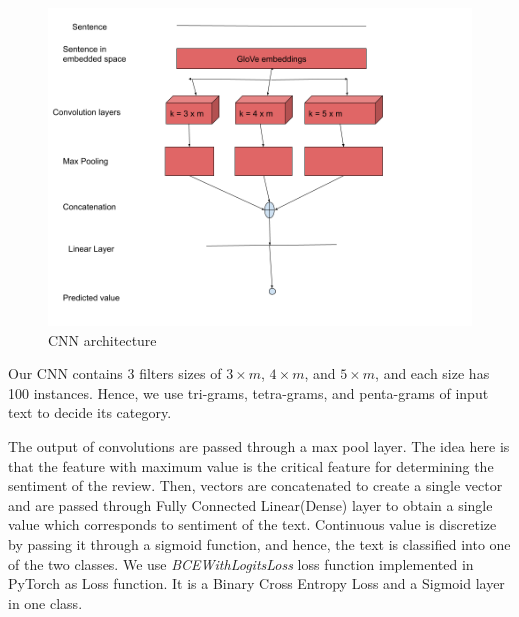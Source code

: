 \documentclass[12pt]{report}
\begin{document}
\begin{spacing}{1.5}
\begin{figure}[!h]
  \centering
  \includegraphics[width=\linewidth]{./img/archi.png}
  \caption{CNN architecture}
  \label{img: archi}
\end{figure}

Our CNN contains 3 filters sizes of $3 \times m$, $4 \times m$, and $5 \times m$, and each size has 100 instances. Hence, we use tri-grams, tetra-grams, and penta-grams of input text to decide its category. 

The output of convolutions are passed through a max pool layer. The idea here is that the feature with maximum value is the critical feature for determining the sentiment of the review.
Then, vectors are concatenated to create a single vector and are passed through Fully Connected Linear(Dense) layer to obtain a single value which corresponds to sentiment of the text.
Continuous value is discretize by passing it through a sigmoid function, and hence, the text is classified into one of the two classes. We use \textit{BCEWithLogitsLoss} loss function implemented in PyTorch \cite{pytorch} as Loss function. It is a Binary Cross Entropy Loss and a Sigmoid layer in one class.


\end{spacing}
\end{document}
